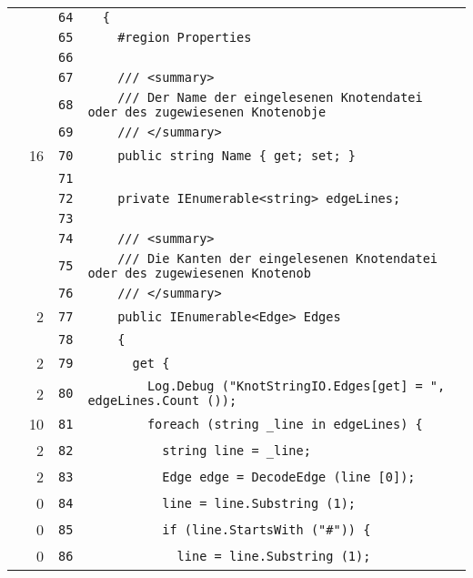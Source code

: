 \documentclass[a4paper,10pt]{article}
\begin{document}
\begin{longtable}[l]{lrrl}
\cellcolor{gray} &  & \verb~64~ & \verb~  {~\\
\cellcolor{gray} &  & \verb~65~ & \verb~    #region Properties~\\
\cellcolor{gray} &  & \verb~66~ & \verb~~\\
\cellcolor{gray} &  & \verb~67~ & \verb~    /// <summary>~\\
\cellcolor{gray} &  & \verb~68~ & \verb~    /// Der Name der eingelesenen Knotendatei oder des zugewiesenen Knotenobje~\\
\cellcolor{gray} &  & \verb~69~ & \verb~    /// </summary>~\\
\cellcolor{green} & 16 & \verb~70~ & \verb~    public string Name { get; set; }~\\
\cellcolor{gray} &  & \verb~71~ & \verb~~\\
\cellcolor{gray} &  & \verb~72~ & \verb~    private IEnumerable<string> edgeLines;~\\
\cellcolor{gray} &  & \verb~73~ & \verb~~\\
\cellcolor{gray} &  & \verb~74~ & \verb~    /// <summary>~\\
\cellcolor{gray} &  & \verb~75~ & \verb~    /// Die Kanten der eingelesenen Knotendatei oder des zugewiesenen Knotenob~\\
\cellcolor{gray} &  & \verb~76~ & \verb~    /// </summary>~\\
\cellcolor{green} & 2 & \verb~77~ & \verb~    public IEnumerable<Edge> Edges~\\
\cellcolor{gray} &  & \verb~78~ & \verb~    {~\\
\cellcolor{green} & 2 & \verb~79~ & \verb~      get {~\\
\cellcolor{green} & 2 & \verb~80~ & \verb~        Log.Debug ("KnotStringIO.Edges[get] = ", edgeLines.Count ());~\\
\cellcolor{green} & 10 & \verb~81~ & \verb~        foreach (string _line in edgeLines) {~\\
\cellcolor{green} & 2 & \verb~82~ & \verb~          string line = _line;~\\
\cellcolor{green} & 2 & \verb~83~ & \verb~          Edge edge = DecodeEdge (line [0]);~\\
\cellcolor{red} & 0 & \verb~84~ & \verb~          line = line.Substring (1);~\\
\cellcolor{red} & 0 & \verb~85~ & \verb~          if (line.StartsWith ("#")) {~\\
\cellcolor{red} & 0 & \verb~86~ & \verb~            line = line.Substring (1);~\\

\end{longtable}
\end{document}
